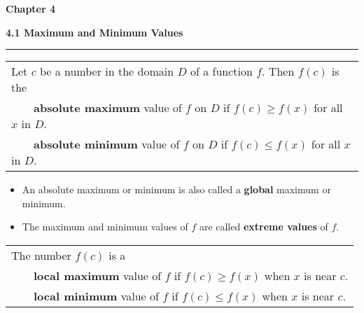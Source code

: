 \documentclass{article}
\newcommand{\tabitem}{~~\llap{\textbullet}~~}
\begin{document}
\Huge\textbf{Chapter 4}
\vspace{16pt}

\begin{center}
\Large\textbf{4.1 Maximum and Minimum Values}

\noindent\hfill\rule{0.3\textwidth}{.4pt}\hfill
\vspace{24pt}

\large
\def\arraystretch{1.3}
{\setlength{\tabcolsep}{16pt}
\begin{tabularx}{.9\textwidth}{|X|}
\hline
	Let $c$ be a number in the domain $D$ of a function $f$. Then $f(c)$ is the \\
	\hspace{12pt} \tabitem \textbf{absolute maximum} value of $f$ on $D$ if $f(c) \geq f(x)$ for all $x$ in $D$. \\
	\hspace{12pt} \tabitem \textbf{absolute minimum} value of $f$ on $D$ if $f(c) \leq f(x)$ for all $x$ in $D$. \\

\hline
\end{tabularx}}
\end{center}

\large
\vspace{5pt}
\begin{itemize}[leftmargin=5pt]
	\item An absolute maximum or minimum is also called a \textbf{global} maximum or minimum. 
	\item The maximum and minimum values of $f$ are called \textbf{extreme values} of $f$. 
\end{itemize}
\vspace{12pt}

\begin{center}
\large
\def\arraystretch{1.3}
{\setlength{\tabcolsep}{16pt}
\begin{tabularx}{.9\textwidth}{|X|}
\hline
	The number $f(c)$ is a \\
	\hspace{12pt} \tabitem \textbf{local maximum} value of $f$ if $f(c) \geq f(x)$ when $x$ is near $c$. \\
	\hspace{12pt} \tabitem \textbf{local minimum} value of $f$ if $f(c) \leq f(x)$ when $x$ is near $c$. \\

\hline
\end{tabularx}}
\end{center}
\end{document}
